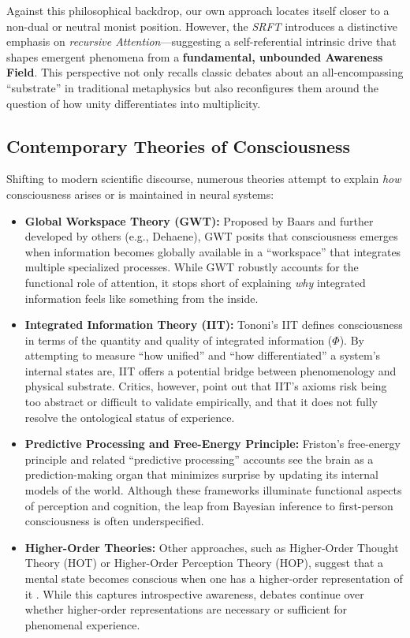 \documentclass[12pt,a4paper]{article}
\begin{document}
Against this philosophical backdrop, our own approach locates itself closer to a non-dual or neutral monist position. However, the \emph{SRFT} introduces a distinctive emphasis on \emph{recursive Attention}---suggesting a self-referential intrinsic drive that shapes emergent phenomena from a \textbf{fundamental, unbounded Awareness Field}. This perspective not only recalls classic debates about an all-encompassing “substrate” in traditional metaphysics but also reconfigures them around the question of how unity differentiates into multiplicity.

\subsection{Contemporary Theories of Consciousness}
\label{subsec:consciousness-theories}

Shifting to modern scientific discourse, numerous theories attempt to explain \emph{how} consciousness arises or is maintained in neural systems:

\begin{itemize}
    \item \textbf{Global Workspace Theory (GWT):} 
    Proposed by Baars \cite{baars1988} and further developed by others (e.g., Dehaene), GWT posits that consciousness emerges when information becomes globally available in a ``workspace'' that integrates multiple specialized processes. While GWT robustly accounts for the functional role of attention, it stops short of explaining \emph{why} integrated information feels like something from the inside.

    \item \textbf{Integrated Information Theory (IIT):} 
    Tononi’s \cite{tononi2008} IIT defines consciousness in terms of the quantity and quality of integrated information ($\Phi$). By attempting to measure ``how unified'' and ``how differentiated'' a system’s internal states are, IIT offers a potential bridge between phenomenology and physical substrate. Critics, however, point out that IIT’s axioms risk being too abstract or difficult to validate empirically, and that it does not fully resolve the ontological status of experience.

    \item \textbf{Predictive Processing and Free-Energy Principle:} 
    Friston’s free-energy principle \cite{friston2010} and related ``predictive processing'' accounts see the brain as a prediction-making organ that minimizes surprise by updating its internal models of the world. Although these frameworks illuminate functional aspects of perception and cognition, the leap from Bayesian inference to first-person consciousness is often underspecified.

    \item \textbf{Higher-Order Theories:} 
    Other approaches, such as Higher-Order Thought Theory (HOT) or Higher-Order Perception Theory (HOP), suggest that a mental state becomes conscious when one has a higher-order representation of it \cite{rosenthal2005}. While this captures introspective awareness, debates continue over whether higher-order representations are necessary or sufficient for phenomenal experience.
\end{itemize}
\end{document}
